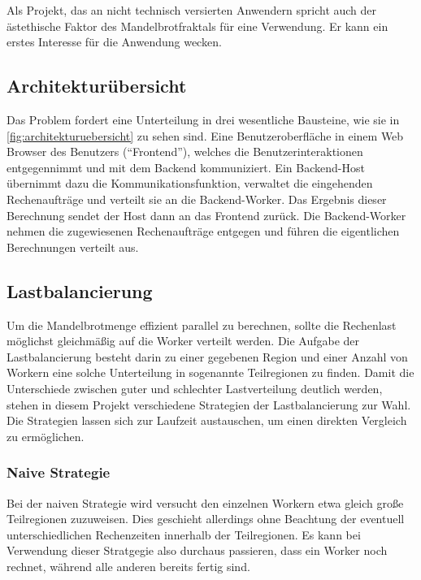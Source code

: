Als Projekt, das an nicht technisch versierten Anwendern spricht auch der ästethische
Faktor des Mandelbrotfraktals für eine Verwendung.
Er kann ein erstes Interesse für die Anwendung wecken.


\subsection{Architekturübersicht}
Das Problem fordert eine Unterteilung in drei wesentliche Bausteine, wie sie in \autoref{fig:architekturuebersicht} zu sehen sind.
Eine Benutzeroberfläche in einem Web Browser des Benutzers (“Frontend”), welches die Benutzerinteraktionen entgegennimmt und mit dem Backend kommuniziert.
Ein Backend-Host übernimmt dazu die Kommunikationsfunktion, verwaltet die eingehenden Rechenaufträge und verteilt sie an die Backend-Worker.
Das Ergebnis dieser Berechnung sendet der Host dann an das Frontend zurück.
Die Backend-Worker nehmen die zugewiesenen Rechenaufträge entgegen und führen die eigentlichen Berechnungen verteilt aus.


\subsection{Lastbalancierung}\label{sec:load_balancing_concepts}

Um die Mandelbrotmenge effizient parallel zu berechnen, sollte die Rechenlast möglichst gleichmäßig auf die Worker verteilt werden.
Die Aufgabe der Lastbalancierung besteht darin zu einer gegebenen Region und einer Anzahl von Workern eine solche Unterteilung in sogenannte Teilregionen zu finden.
Damit die Unterschiede zwischen guter und schlechter Lastverteilung deutlich werden, stehen in diesem Projekt verschiedene Strategien der Lastbalancierung zur Wahl.
Die Strategien lassen sich zur Laufzeit austauschen, um einen direkten Vergleich zu ermöglichen.

\subsubsection{Naive Strategie}

Bei der naiven Strategie wird versucht den einzelnen Workern etwa gleich große Teilregionen zuzuweisen.
Dies geschieht allerdings ohne Beachtung der eventuell unterschiedlichen Rechenzeiten innerhalb der Teilregionen.
Es kann bei Verwendung dieser Stratgegie also durchaus passieren, dass ein Worker noch rechnet, während alle anderen bereits fertig sind.

